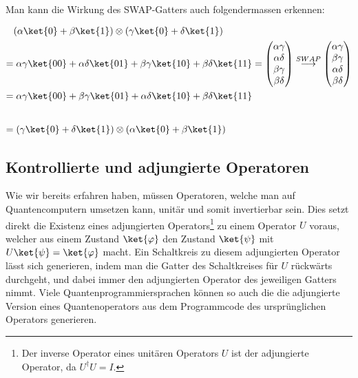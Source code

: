 \paragraph{}
\noindent Man kann die Wirkung des SWAP-Gatters auch folgendermassen erkennen:

\vspace{-0.3cm}
\[\begin{split}
&(\alpha \ket{0}+\beta\ket{1})\otimes(\gamma\ket{0}+\delta\ket{1}) \\
= &\;\alpha\gamma\ket{00} +\alpha\delta\ket{01}+\beta\gamma\ket{10}+\beta\delta\ket{11} = \begin{pmatrix} \alpha\gamma \\ \alpha\delta \\ \beta\gamma \\ \beta\delta \end{pmatrix} \overset{SWAP}{\longrightarrow }  \begin{pmatrix} \alpha\gamma \\ \beta\gamma  \\ \alpha\delta \\ \beta\delta \end{pmatrix}  \\
= &\;\alpha\gamma\ket{00} +\beta\gamma\ket{01}+\alpha\delta\ket{10}+\beta\delta\ket{11}   \\[0.7cm]
= & \; (\gamma\ket{0}+\delta\ket{1})\otimes(\alpha \ket{0}+\beta\ket{1}) \\
\end{split}\]

\subsection{Kontrollierte und adjungierte Operatoren}
Wie wir bereits erfahren haben, müssen Operatoren, welche man auf Quantencomputern umsetzen kann, unitär und somit invertierbar sein. Dies setzt direkt die Existenz eines adjungierten Operators\footnote{Der inverse Operator eines unitären Operators $U$ ist der adjungierte Operator, da $U^\dagger U = I$.} zu einem Operator $U$ voraus, welcher aus einem Zustand $\ket{\varphi}$ den Zustand $\ket{\psi}$ mit $U\ket{\psi} = \ket{\varphi}$ macht. Ein Schaltkreis zu diesem adjungierten Operator lässt sich generieren, indem man die Gatter des Schaltkreises für $U$ rückwärts durchgeht, und dabei immer den adjungierten Operator des jeweiligen Gatters nimmt. Viele Quantenprogrammiersprachen können so auch die die adjungierte Version eines Quantenoperators aus dem Programmcode des ursprünglichen Operators generieren.

